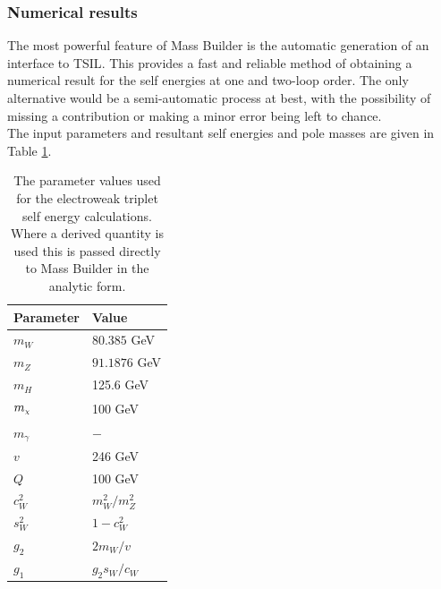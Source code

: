 \documentclass[11pt]{article}
\newcommand{\mychi}{\raisebox{0pt}[1ex][1ex]{\tiny$\chi$}}
\def\mc{m_{\mychi}}
\newcommand{\mb}{\textsf{Mass Builder} }
\newcommand{\tsils}{\textsf{TSIL}}
\begin{document}
\subsubsection{Numerical results}

The most powerful feature of \mb is the automatic generation of an interface to \tsils.  This provides a fast and reliable method of obtaining a numerical result for the self energies at one and two-loop order.  The only alternative would be a semi-automatic process at best, with the possibility of missing a contribution or making a minor error being left to chance.\\

The input parameters and resultant self energies and pole masses are given in Table \ref{table:input_params}.

\begin{table}[h!]
\caption{The parameter values used for the electroweak triplet self energy calculations.  Where a derived quantity is used this is passed directly to \mb in the analytic form.}\label{table:input_params}
\centering
\vspace{0.5cm}
\begin{tabular}{l l}
\hline
Parameter & Value\\
\hline
$m_W$ & $80.385$ GeV \\
$m_Z$ & $91.1876$ GeV \\
$m_H$ & 125.6 GeV\\
$\mc$ & 100 GeV\\
$m_{\gamma}$ & $-$ \\
$v$ & 246 GeV \\
$Q$ & 100 GeV \\
$c_W^2$ & $m^2_W/m^2_Z$ \\
$s_W^2$ & $1-c^2_W$ \\
$g_2$ & $2m_W/v$\\
$g_1$ & $g_2 s_W/c_W$\\
\hline\end{tabular}
\end{table}
\end{document}
